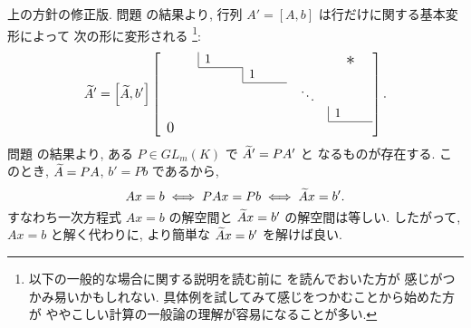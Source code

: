 \documentclass[12pt,twoside]{jarticle}
\begin{document}
上の方針の修正版. 
問題  の結果より, 行列 $A'=[A,b]$ は行だけに関する基本変形によって
次の形に変形される%
\footnote{以下の一般的な場合に関する説明を読む前に
  を読んでおいた方が
  感じがつかみ易いかもしれない.  
  具体例を試してみて感じをつかむことから始めた方が
  ややこしい計算の一般論の理解が容易になることが多い.}:
\begin{equation*}
  \tA' = \left[\tA,b'\right]
  \left[
    \begin{array}{ccccc}
      \multicolumn{1}{c|}{\qquad} & 1 \qquad & & & \bigstaru \\
      \cline{2-2}
      \multicolumn{2}{c|}{} & 1 \qquad & & \\
      \cline{3-3}
      \multicolumn{3}{c}{} & \;\;\ddots\;\; & \\
      \multicolumn{4}{c|}{} & 1 \qquad \\
      \cline{5-5}
      \multicolumn{5}{l}{\bigzerol} \\
    \end{array}
  \right]. 
\end{equation*}
問題  の結果より, ある $P\in GL_m(K)$ で ${\widetilde A}'=PA'$ と
なるものが存在する. このとき, ${\widetilde A}=PA$, $b'=Pb$ であるから,
\begin{equation*}
  Ax = b \iff PAx = Pb \iff {\widetilde A} x = b'.
\end{equation*}
すなわち一次方程式 $Ax=b$ の解空間と ${\widetilde A} x=b'$ の解空間は等しい.
したがって, $Ax=b$ と解く代わりに, より簡単な ${\widetilde A} x=b'$ を解けば良い.

\end{document}
